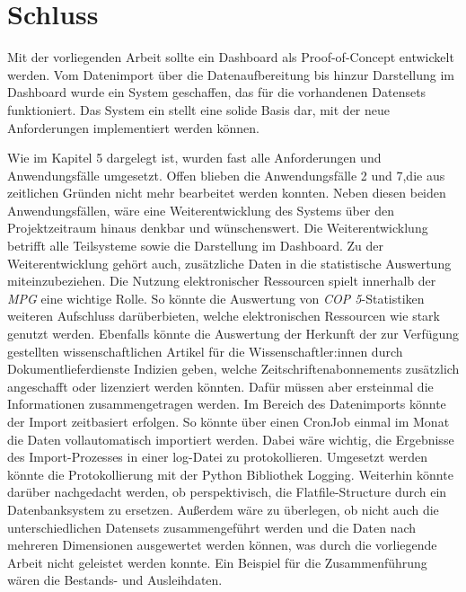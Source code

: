 
\chapter{Schluss}
\label{chap:six}
Mit der vorliegenden Arbeit sollte ein Dashboard als Proof-of-Concept entwickelt werden.
Vom Datenimport über die Datenaufbereitung bis hinzur Darstellung im Dashboard wurde ein System geschaffen,
das für die vorhandenen Datensets funktioniert. 
Das System ein stellt eine solide Basis dar, mit der neue Anforderungen implementiert werden können.

Wie im Kapitel 5 dargelegt ist, wurden fast alle Anforderungen und Anwendungsfälle umgesetzt.
Offen blieben die Anwendungsfälle 2 und 7,die aus zeitlichen Gründen nicht mehr bearbeitet werden konnten.
Neben diesen beiden Anwendungsfällen, wäre eine Weiterentwicklung des Systems über den Projektzeitraum hinaus denkbar und wünschenswert.
Die Weiterentwicklung betrifft alle Teilsysteme sowie die Darstellung im Dashboard. 
Zu der Weiterentwicklung gehört auch, zusätzliche Daten  in die statistische Auswertung miteinzubeziehen. 
Die Nutzung elektronischer Ressourcen spielt innerhalb der \textit{\acrshort{MPG}} eine wichtige Rolle.
So könnte die Auswertung von \textit{\acrshort{COP 5}}-Statistiken weiteren Aufschluss darüberbieten, welche elektronischen Ressourcen wie stark genutzt werden.
Ebenfalls könnte die Auswertung der Herkunft der zur Verfügung gestellten wissenschaftlichen Artikel für die Wissenschaftler:innen durch Dokumentlieferdienste
Indizien geben, welche Zeitschriftenabonnements zusätzlich angeschafft oder lizenziert werden könnten. Dafür müssen aber ersteinmal die Informationen zusammengetragen
werden.
Im Bereich des Datenimports könnte der Import zeitbasiert erfolgen. So könnte über einen CronJob einmal im Monat die
Daten vollautomatisch importiert werden. Dabei wäre wichtig, die Ergebnisse des Import-Prozesses in einer log-Datei zu protokollieren.
Umgesetzt werden könnte die Protokollierung mit der Python Bibliothek Logging. Weiterhin könnte darüber nachgedacht werden, ob perspektivisch,
die Flatfile-Structure durch ein Datenbanksystem zu ersetzen. Außerdem wäre zu überlegen, ob nicht auch die
unterschiedlichen Datensets zusammengeführt werden und die Daten nach mehreren Dimensionen ausgewertet werden können, was durch die vorliegende
Arbeit nicht geleistet werden konnte. Ein Beispiel für die Zusammenführung wären die Bestands- und Ausleihdaten.

